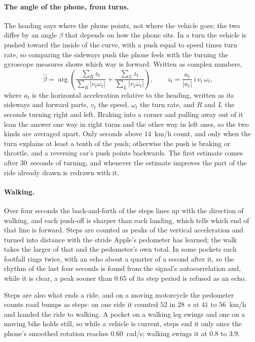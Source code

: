 \documentclass[11pt]{article}
\begin{document}
\paragraph{The angle of the phone, from turns.} The heading says where the phone points, not where the
vehicle goes; the two differ by an angle $\beta$ that depends on how the phone sits. In a turn the
vehicle is pushed toward the inside of the curve, with a push equal to speed times turn rate, so
comparing the sideways push the phone feels with the turning the gyroscope measures shows which way
is forward. Written as complex numbers,
\begin{equation}
\hat\beta = \arg\left(\frac{\sum_{R} z_t}{\sum_{R} |v_t\omega_t|}+\frac{\sum_{L} z_t}{\sum_{L} |v_t\omega_t|}\right),
\qquad z_t=\frac{a_t}{|a_t|}\,\overline{i\,v_t\,\omega_t},
\end{equation}
where $a_t$ is the horizontal acceleration relative to the heading, written as its sideways and forward
parts, $v_t$ the speed, $\omega_t$ the turn rate, and $R$ and $L$ the seconds turning right and left.
Braking into a corner and pulling away out of it lean the answer one way in right turns and the other
way in left ones, so the two kinds are averaged apart. Only seconds above $14$~km/h count, and only
when the turn explains at least a tenth of the push; otherwise the push is braking or throttle, and a
reversing car's push points backwards. The first estimate comes after $30$~seconds of turning, and
whenever the estimate improves the part of the ride already drawn is redrawn with it.

\paragraph{Walking.} Over four seconds the back-and-forth of the steps lines up with the direction of
walking, and each push-off is sharper than each landing, which tells which end of that line is
forward. Steps are counted as peaks of the vertical acceleration and turned into distance with the
stride Apple's pedometer has learned; the walk takes the larger of that and the pedometer's own
total. In some pockets each footfall rings twice, with an echo about a quarter of a second after it,
so the rhythm of the last four seconds is found from the signal's autocorrelation and, while it is
clear, a peak sooner than $0.65$ of its step period is refused as an echo.

Steps are also what ends a ride, and on a moving motorcycle the pedometer counts road bumps as steps: on
one ride it counted $52$ in $28$~s at $41$ to $56$~km/h and handed the ride to walking. A pocket on a walking
leg swings and one on a moving bike holds still, so while a vehicle is current, steps end it only once the
phone's smoothed rotation reaches $0.60$~rad/s; walking swings it at $0.8$ to $3.9$.
\end{document}
